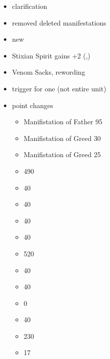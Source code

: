 

\subtitle{2023 \betaname{} 2 hotfix 1}
\begin{itemize}
	\item \digestivevomit{} clarification
\end{itemize}

\subtitle{2023 \betaname{} 2}
\begin{itemize}
\item removed deleted manifestations
\item new \greaterdominion
\item Stixian Spirit gains +2 \HealthPoints{} \wordand{} \flymovementlabel{} (,)
\item Venom Sacks, \stiffupperlip{} \wordand{} \mountainbreaker{} rewording
\item \greenfireeyes{} trigger for one \model{} (not entire unit)
\item point changes
\begin{multicols}{2}
	\begin{itemize}
	\item Manifistation of Father \chaos{} \ironhusk{} 95 
	\item Manifistation of Greed \segmentedshell{} 30 
	\item Manifistation of Greed \segmentedshell{} \guiding{} 25 
	\item \omenofsavar{} \basecost{} 490 
	\item \omenofsavar{} \greaterdominion{} 40 
	\item \kuulimasdeceiver{} \greaterdominion{} 40 
	\item \mawofakaan{} \greaterdominion{} 40 
	\item \miserofsugulag{} \greaterdominion{} 40 
	\item \courtesanofcibaresh{} \basecost{} 520 
	\item \courtesanofcibaresh{} \greaterdominion{} 40 
	\item \sentinelofnukuja{} \greaterdominion{} 40 
	\item \sentinelofnukuja{} \strixianspirit{} 0 
	\item \vanadrasscourge{} \greaterdominion{} 40 
	\item \succubi{} \basecost{} 230 
	\item \succubi{} \extramodel{} 17 

\end{itemize}
\end{multicols}
\end{itemize}

